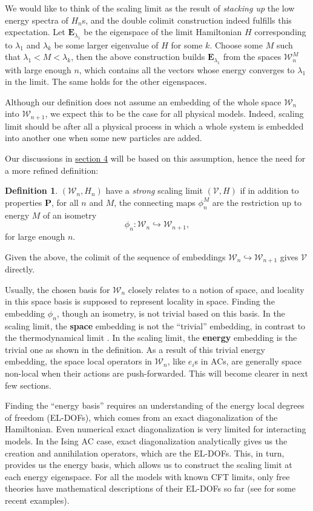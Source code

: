 \documentclass[twoside,11pt,titlepage]{amsart}
\renewcommand{\=}[1]{\stackrel{#1}{=}} %
\theoremstyle{definition}
\newtheorem{dfn}{Definition}
\theoremstyle{remark}
\begin{document}
We would like to think of the scaling limit as the result of \textit{stacking up} the low energy spectra of $H_n$s, and the double colimit construction indeed fulfills this expectation. Let  $\textbf{E}_{\lambda_1}$ be the eigenspace of the limit Hamiltonian $H$ corresponding to $\lambda_1$ and $\lambda_k$ be some larger eigenvalue of $H$ for some $k$. Choose some $M$ such that $\lambda_1<M<\lambda_k$, then the above construction builds $\textbf{E}_{\lambda_1}$ from the spaces $\mathcal{W}_n^M$ with large enough $n$, which contains all the vectors whose energy converges to $\lambda_1$ in the limit. The same holds for the other eigenspaces. 

Although our definition does not assume an embedding of the whole space $\mathcal{W}_n$ into $\mathcal{W}_{n+1}$, we expect this to be the case for all physical models. Indeed, scaling limit should be after all a physical process in which a whole system is embedded into another one when some new particles are added.

Our discussions in \hyperref[4]{section 4} will be based on this assumption, hence the need for a more refined definition:
\begin{dfn}\label{dfn4}
$(\mathcal{W}_n,H_n)$ have a \textit{strong} scaling limit $(\mathcal{V},H)$ if in addition to properties \textbf{P}, for all $n$ and $M$, the connecting maps $\phi_n^M$ are the restriction up to energy $M$ of an isometry
$$\phi_n : \mathcal{W}_n \hookrightarrow \mathcal{W}_{n+1},$$
for large enough $n$.
\end{dfn}

Given the above, the colimit of the sequence of embeddings $\mathcal{W}_n \hookrightarrow \mathcal{W}_{n+1}$ gives $\mathcal{V}$ directly.

Usually, the chosen basis for $\mathcal{W}_n$ closely relates to a notion of space, and locality in this space basis is supposed to represent locality in space. Finding the embedding $\phi_n$, though an isometry, is not  trivial based on this basis. In the scaling limit, the \textbf{space} embedding is not the ``trivial'' embedding, in contrast to the thermodynamical limit \cite[Appendix A]{fiedler2017jones}. In the scaling limit, the \textbf{energy} embedding is the trivial one as shown in the definition. As a result of this trivial energy embedding, the space local operators in $\mathcal{W}_n$, like $e_i$s in ACs, are generally space non-local when their actions are push-forwarded. This will become clearer in next few sections.

Finding the ``energy basis'' requires an understanding of the energy local degrees of freedom (EL-DOFs), which comes from an exact diagonalization of the Hamiltonian. Even numerical exact diagonalization is very limited for interacting models. In the Ising AC case, exact diagonalization analytically gives us the creation and annihilation operators, which are the EL-DOFs.  This, in turn, provides us the energy basis, which allows us to construct the scaling limit at each energy eigenspace. For all the models with known CFT limits, only free theories have mathematical descriptions of their EL-DOFs so far (see \cite{fendley2014free, gainutdinov2016associative, gainutdinov2014lattice} for some recent examples).
\end{document}
